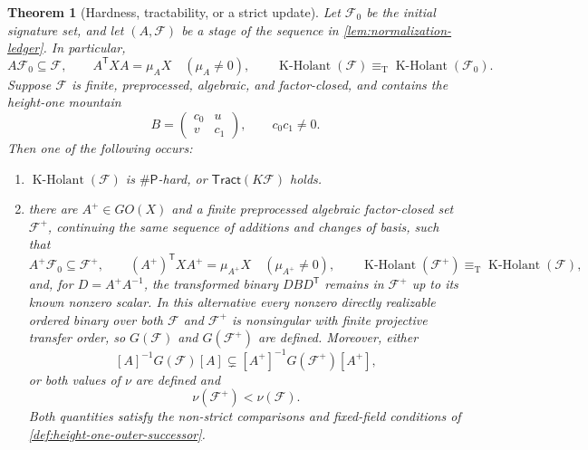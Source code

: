 \documentclass[11pt,letterpaper,onecolumn]{article}
\theoremstyle{plain}
\newtheorem{theorem}{Theorem}[section]
\theoremstyle{definition}
\theoremstyle{remark}
\newcommand{\cF}{\mathcal F}
\newcommand{\KHolant}{\operatorname{K\text{-}Holant}}
\newcommand{\Tract}{\mathsf{Tract}}
\newcommand{\SharpP}{\#\mathsf P}
\newcommand{\equivT}{\equiv_{\mathrm T}}
\begin{document}
	\begin{theorem}[Hardness, tractability, or a strict update]
		\label{thm:height-one-transfer-interface}
		Let \(\cF_0\) be the initial signature set, and let
		\((A,\cF)\) be a stage of the sequence in
		\cref{lem:normalization-ledger}. In particular,
		\[
		A\cF_0\subseteq\cF,
		\qquad A^{\mathsf T}XA=\mu_AX\quad(\mu_A\ne0),
		\qquad \KHolant(\cF)\equivT\KHolant(\cF_0).
		\]
		Suppose \(\cF\) is finite, preprocessed, algebraic, and factor-closed,
		and contains the height-one mountain
		\[
		B=\begin{pmatrix}c_0&u\\v&c_1\end{pmatrix},
		\qquad c_0c_1\ne0.
		\]
		Then one of the following occurs:
		\begin{enumerate}
			\item \(\KHolant(\cF)\) is \(\SharpP\)-hard, or
			\(\Tract(K\cF)\) holds.
			\item there are \(A^+\in GO(X)\) and a finite preprocessed algebraic
			factor-closed set \(\cF^+\), continuing the same
			sequence of additions and changes of basis, such that
			\[
			A^+\cF_0\subseteq\cF^+,
			\qquad
			(A^+)^{\mathsf T}XA^+=\mu_{A^+}X\quad(\mu_{A^+}\ne0),
			\qquad
			\KHolant(\cF^+)\equivT\KHolant(\cF),
			\]
			and, for \(D=A^+A^{-1}\), the transformed binary
			\(DBD^{\mathsf T}\) remains in \(\cF^+\) up to its known nonzero
			scalar.  In this alternative every nonzero directly realizable ordered
			binary over both \(\cF\) and \(\cF^+\) is nonsingular with
			finite projective transfer order, so
			\(G(\cF)\) and \(G(\cF^+)\) are defined.  Moreover, either
			\[
			[A]^{-1}G(\cF)[A]
			\subsetneq
			[A^+]^{-1}G(\cF^+)[A^+],
			\]
			or both values of \(\nu\) are defined and
			\[
			\nu(\cF^+)<\nu(\cF).
			\]
			Both quantities satisfy the non-strict comparisons and fixed-field
			conditions of \cref{def:height-one-outer-successor}.
		\end{enumerate}
	\end{theorem}
	
\end{document}
